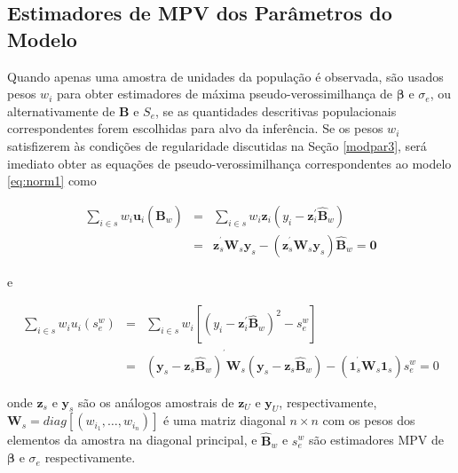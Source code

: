 \documentclass[]{book}
\numberwithin{example}{chapter}
\numberwithin{remark}{chapter}
\numberwithin{definition}{chapter}
\begin{document}
\subsection{Estimadores de MPV dos Parâmetros do
Modelo}\label{estimadores-de-mpv-dos-parametros-do-modelo}

Quando apenas uma amostra de unidades da população é observada, são
usados pesos \(w_{i}\) para obter estimadores de máxima
pseudo-verossimilhança de \(\mathbf{\beta }\) e \(\sigma _{e}\), ou
alternativamente de \(\mathbf{B}\) e \(S_{e}\), se as quantidades
descritivas populacionais correspondentes forem escolhidas para alvo da
inferência. Se os pesos \(w_{i}\) satisfizerem às condições de
regularidade discutidas na Seção \ref{modpar3}, será imediato obter as
equações de pseudo-verossimilhança correspondentes ao modelo
\eqref{eq:norm1} como

\begin{eqnarray}
\sum\limits_{i\in s}w_{i}\mathbf{u}_{i}\left( \mathbf{\hat{B}}_{w}\right)
&=&\sum\limits_{i\in s}w_{i}\mathbf{z}_{i}\left( y_{i}-\mathbf{z}
_{i}^{\prime }\mathbf{\hat{B}}_{w}\right)  \label{eq:norm12} \\
&=&\mathbf{z}_{s}^{^{\prime }}\mathbf{W}_{s}\mathbf{y}_{s}-\left( \mathbf{z}
_{s}^{^{\prime }}\mathbf{W}_{s}\mathbf{y}_{s}\right) \mathbf{\hat{B}}_{w}=
\mathbf{0}  \nonumber
\end{eqnarray}

e

\begin{eqnarray}
\sum\limits_{i\in s}w_{i}u_{i}\left( s_{e}^{w}\right) &=&\sum\limits_{i\in
s}w_{i}\left[ \left( y_{i}-\mathbf{z}_{i}^{\prime }\mathbf{\hat{B}}
_{w}\right) ^{2}-s_{e}^{w}\right]  \label{eq:norm13} \\
&=&\left( \mathbf{y}_{s}-\mathbf{z}_{s}\mathbf{\hat{B}}_{w}\right)
^{^{\prime }}\mathbf{W}_{s}\left( \mathbf{y}_{s}-\mathbf{z}_{s}\mathbf{\hat{B
}}_{w}\right) -\left( \mathbf{1}_{s}^{^{\prime }}\mathbf{W}_{s}\mathbf{1}
_{s}\right) s_{e}^{w}=0  \nonumber
\end{eqnarray}

onde \(\mathbf{z}_{s}\) e \(\mathbf{y}_{s}\) são os análogos amostrais
de \(\mathbf{z}_{U}\) e \(\mathbf{y}_{U}\), respectivamente,
\(\mathbf{W}_{s}=diag\left[ \left( w_{i_{1}},\ldots ,w_{i_{n}}\right) \right]\)
é uma matriz diagonal \(n\times n\) com os pesos dos elementos da
amostra na diagonal principal, e \(\mathbf{\hat{B}}_{w}\) e
\(s_{e}^{w}\) são estimadores MPV de \(\mathbf{\beta }\) e
\(\sigma _{e}\) respectivamente.
\end{document}
